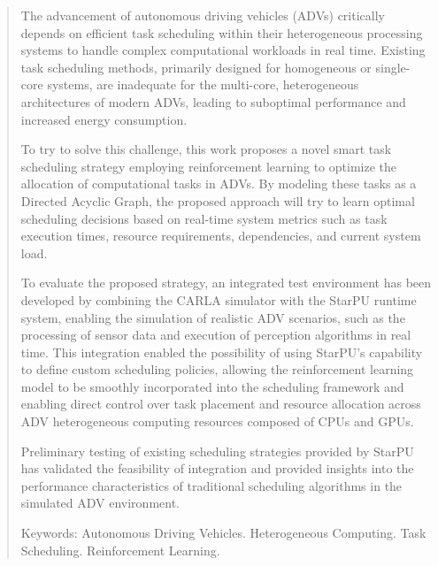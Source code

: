 \begin{abstract}
\vspace{0.4cm}
\onehalfspacing

The advancement of autonomous driving vehicles (ADVs) critically depends on efficient task scheduling within their heterogeneous processing systems to handle complex computational workloads in real time. Existing task scheduling methods, primarily designed for homogeneous or single-core systems, are inadequate for the multi-core, heterogeneous architectures of modern ADVs, leading to suboptimal performance and increased energy consumption.

To try to solve this challenge, this work proposes a novel smart task scheduling strategy employing reinforcement learning to optimize the allocation of computational tasks in ADVs. By modeling these tasks as a Directed Acyclic Graph, the proposed approach will try to learn optimal scheduling decisions based on real-time system metrics such as task execution times, resource requirements, dependencies, and current system load.

To evaluate the proposed strategy, an integrated test environment has been developed by combining the CARLA simulator with the StarPU runtime system, enabling the simulation of realistic ADV scenarios, such as the processing of sensor data and execution of perception algorithms in real time. This integration enabled the possibility of using StarPU's capability to define custom scheduling policies, allowing the reinforcement learning model to be smoothly incorporated into the scheduling framework and enabling direct control over task placement and resource allocation across ADV heterogeneous computing resources composed of CPUs and GPUs. 

Preliminary testing of existing scheduling strategies provided by StarPU has validated the feasibility of integration and provided insights into the performance characteristics of traditional scheduling algorithms in the simulated ADV environment.

\vspace*{.50cm}
\noindent Keywords: Autonomous Driving Vehicles. Heterogeneous Computing. Task Scheduling. Reinforcement Learning. \\
\end{abstract}
